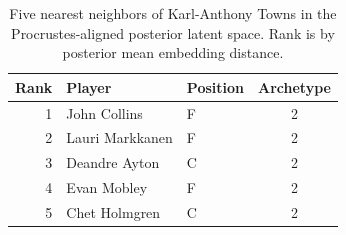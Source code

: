 \begin{table}[htbp]
  \centering\small
  \begin{tabular}{rllc}
    \toprule
    Rank & Player & Position & Archetype \\
    \midrule
    1 & John Collins & F & 2 \\
    2 & Lauri Markkanen & F & 2 \\
    3 & Deandre Ayton & C & 2 \\
    4 & Evan Mobley & F & 2 \\
    5 & Chet Holmgren & C & 2 \\
    \bottomrule
  \end{tabular}
  \caption{Five nearest neighbors of Karl-Anthony Towns in the Procrustes-aligned posterior latent space. Rank is by posterior mean embedding distance.}
  \label{tab:Karl_Anthony_Towns_neighbors}
\end{table}

